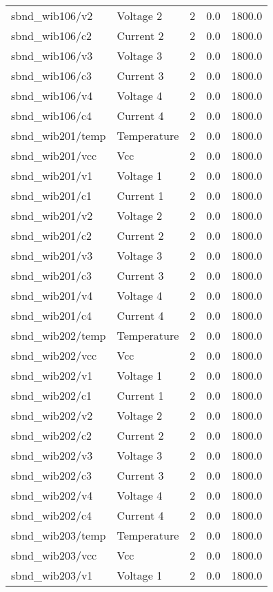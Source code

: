 \begin{center}
\begin{longtable}{l | l l l l }
sbnd\_wib106/v2 & Voltage 2 & 2 & 0.0 & 1800.0\\ 
sbnd\_wib106/c2 & Current 2 & 2 & 0.0 & 1800.0\\ 
sbnd\_wib106/v3 & Voltage 3 & 2 & 0.0 & 1800.0\\ 
sbnd\_wib106/c3 & Current 3 & 2 & 0.0 & 1800.0\\ 
sbnd\_wib106/v4 & Voltage 4 & 2 & 0.0 & 1800.0\\ 
sbnd\_wib106/c4 & Current 4 & 2 & 0.0 & 1800.0\\ 
sbnd\_wib201/temp & Temperature & 2 & 0.0 & 1800.0\\ 
sbnd\_wib201/vcc & Vcc & 2 & 0.0 & 1800.0\\ 
sbnd\_wib201/v1 & Voltage 1 & 2 & 0.0 & 1800.0\\ 
sbnd\_wib201/c1 & Current 1 & 2 & 0.0 & 1800.0\\ 
sbnd\_wib201/v2 & Voltage 2 & 2 & 0.0 & 1800.0\\ 
sbnd\_wib201/c2 & Current 2 & 2 & 0.0 & 1800.0\\ 
sbnd\_wib201/v3 & Voltage 3 & 2 & 0.0 & 1800.0\\ 
sbnd\_wib201/c3 & Current 3 & 2 & 0.0 & 1800.0\\ 
sbnd\_wib201/v4 & Voltage 4 & 2 & 0.0 & 1800.0\\ 
sbnd\_wib201/c4 & Current 4 & 2 & 0.0 & 1800.0\\ 
sbnd\_wib202/temp & Temperature & 2 & 0.0 & 1800.0\\ 
sbnd\_wib202/vcc & Vcc & 2 & 0.0 & 1800.0\\ 
sbnd\_wib202/v1 & Voltage 1 & 2 & 0.0 & 1800.0\\ 
sbnd\_wib202/c1 & Current 1 & 2 & 0.0 & 1800.0\\ 
sbnd\_wib202/v2 & Voltage 2 & 2 & 0.0 & 1800.0\\ 
sbnd\_wib202/c2 & Current 2 & 2 & 0.0 & 1800.0\\ 
sbnd\_wib202/v3 & Voltage 3 & 2 & 0.0 & 1800.0\\ 
sbnd\_wib202/c3 & Current 3 & 2 & 0.0 & 1800.0\\ 
sbnd\_wib202/v4 & Voltage 4 & 2 & 0.0 & 1800.0\\ 
sbnd\_wib202/c4 & Current 4 & 2 & 0.0 & 1800.0\\ 
sbnd\_wib203/temp & Temperature & 2 & 0.0 & 1800.0\\ 
sbnd\_wib203/vcc & Vcc & 2 & 0.0 & 1800.0\\ 
sbnd\_wib203/v1 & Voltage 1 & 2 & 0.0 & 1800.0\\ 

\end{longtable}
\end{center}
